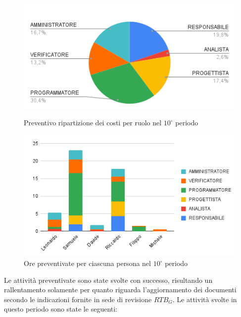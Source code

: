 \begin{figure}[H]
    \centering
  \includegraphics[width=0.6\linewidth]{grafici/10_periodo_torta.png}
  \caption{Preventivo ripartizione dei costi per ruolo nel $10^\circ$ periodo}
        \vspace{5mm}
  \includegraphics[width=0.7\linewidth]{grafici/10_periodo_istogramma.png}
  \caption{Ore preventivate per ciascuna persona nel $10^\circ$ periodo}
\end{figure}
Le attività preventivate sono state svolte con successo, risultando un rallentamento solamente per quanto riguarda l'aggiornamento dei documenti secondo le indicazioni fornite in sede di revisione $\textit{RTB}_G$.
Le attività svolte in questo periodo sono state le seguenti:
